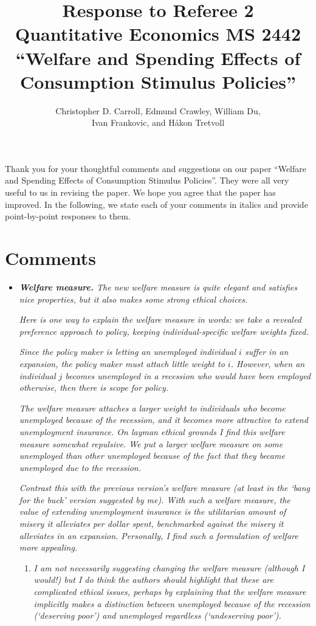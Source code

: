 \documentclass[12pt,letterpaper,english]{article}
\title{\textbf{Response to Referee 2\\ Quantitative Economics MS 2442 \\``Welfare and Spending Effects of \\ Consumption Stimulus Policies''}}
\author{Christopher D. Carroll, Edmund Crawley, William Du, \\ Ivan Frankovic, and H\aa kon Tretvoll}
\date{}
\begin{document}
\onehalfspacing
\maketitle
	
\noindent Thank you for your thoughtful comments and suggestions on our paper ``Welfare and Spending Effects of Consumption Stimulus Policies''. They were all very useful to us in revising the paper. We hope you agree that the paper has improved. In the following, we state each of your comments in italics and provide point-by-point responses to them.
	
\section{Comments}
\begin{itemize}

	\item \textit{\textbf{Welfare measure.} The new welfare measure is quite elegant and satisfies nice properties, but it also makes some strong ethical choices.}
		
	\textit{Here is one way to explain the welfare measure in words: we take a revealed preference approach to policy, keeping individual-specific welfare weights fixed.}
		
	\textit{Since the policy maker is letting an unemployed individual $i$ suffer in an expansion, the policy maker must attach little weight to $i$. However, when an individual $j$ becomes unemployed in a recession who would have been	employed otherwise, then there is scope for policy.}
	
	\textit{The welfare measure attaches a larger weight to individuals who become unemployed because of the recession, and it becomes more attractive to extend unemployment insurance. On layman ethical grounds I find this welfare measure somewhat repulsive. We put a larger welfare measure on some unemployed than other unemployed because of the fact that they became unemployed due to the recession.}
	
	\textit{Contrast this with the previous version’s welfare measure (at least in the ‘bang for the buck’ version suggested by me). With such a welfare measure, the value of extending unemployment insurance is the utilitarian amount of misery it alleviates per dollar spent, benchmarked against the misery it alleviates in an expansion. Personally, I find such a formulation of welfare more appealing.}

	\begin{enumerate}
		\item \textit{I am not necessarily suggesting changing the welfare measure (although I would!) but I do think the authors should highlight that these are complicated ethical issues, perhaps by explaining that the welfare measure implicitly makes a distinction between unemployed because of the recession (‘deserving poor’) and unemployed regardless (‘undeserving poor’).}
	\end{enumerate}
	

\end{itemize}
\end{document}

